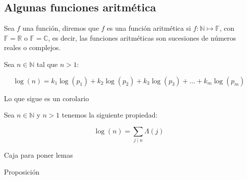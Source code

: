 \subsection{Algunas funciones aritmética}

\begin{definition}
    Sea $f$ una función, diremos que $f$ es una función aritmética si $f: \mathbb{N}\mapsto \mathbb{F}$, con $\mathbb{F}=\mathbb{R}$ o $\mathbb{F}=\mathbb{C}$, es decir, las funciones aritméticas son sucesiones de números reales o complejos.
\end{definition}


\begin{theorem}
    Sea $n\in \mathbb{N}$ tal que $n>1$:

    $$\log(n)=k_1\log(p_1)+k_2\log(p_2)+k_3\log(p_3)+\ldots+k_m\log(p_m)$$
\end{theorem}

Lo que sigue es un corolario

\begin{corollary}
    Sea $n\in \mathbb{N}$ y $n>1$ tenemos la siguiente propiedad:

    $$\log(n)=\sum_{j\mid n}\Lambda(j)$$
\end{corollary}

\lipsum[4]

\begin{eg}
    \lipsum[3]
\end{eg}

\lipsum[9]
\begin{lemma}
    Caja para  poner lemas \lipsum[4]
\end{lemma}

\lipsum[1-9]

\begin{prop}
    Proposición \lipsum[6]
\end{prop}